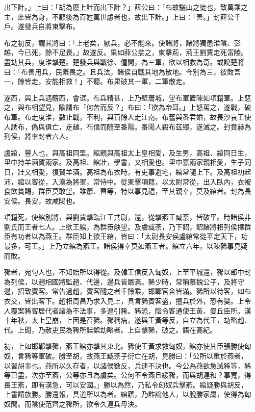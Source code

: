 \begin{pinyinscope}
出下計。」上曰：「胡為廢上計而出下計？」薛公曰：「布故驪山之徒也，致萬乘之主，此皆為身，不顧後為百姓萬世慮者也，故出下計。」上曰：「善。」封薛公千戶。遂發兵自將東擊布。

布之初反，謂其將曰：「上老矣，厭兵，必不能來。使諸將，諸將獨患淮陰、彭越，今已死，餘不足畏。」故遂反。果如薛公揣之，東擊荊，荊王劉賈走死富陵。盡劫其兵，度淮擊楚。楚發兵與戰徐、僮間，為三軍，欲以相救為奇。或說楚將曰：「布善用兵，民素畏之。且兵法，諸侯自戰其地為散地。今別為三，彼敗吾一，餘皆走，安能相救！」不聽。布果破其一軍，二軍散走。

遂西，與上兵遇蘄西，會诓。布兵精甚，上乃壁庸城，望布軍置陳如項籍軍。上惡之，與布相望見，隃謂布「何苦而反？」布曰：「欲為帝耳。」上怒罵之，遂戰，破布軍。布走度淮，數止戰，不利，與百餘人走江南。布舊與番君婚，故長沙哀王使人誘布，偽與俱亡，走越，布信而隨至番陽。番陽人殺布茲鄉，遂滅之。封賁赫為列侯，將率封者六人。

盧綰，豐人也，與高祖同里。綰親與高祖太上皇相愛，及生男，高祖、綰同日生，里中持羊酒賀兩家。及高祖、綰壯，學書，又相愛也。里中嘉兩家親相愛，生子同日，壯又相愛，復賀羊酒。高祖為布衣時，有吏事避宅，綰常隨上下。及高祖初起沛，綰以客從，入漢為將軍，常侍中。從東擊項籍，以太尉常從，出入臥內，衣被食飲賞賜，群臣莫敢望。雖蕭、曹等，特以事見禮，至其親幸，莫及綰者。封為長安侯。長安，故咸陽也。

項籍死，使綰別將，與劉賈擊臨江王共尉，還，從擊燕王臧荼，皆破平。時諸侯非劉氏而王者七人。上欲王綰，為群臣觖望。及虜臧荼，乃下詔，詔諸將相列侯擇群臣有功者以為燕王。群臣知上欲王綰，皆曰：「太尉長安侯盧綰常從平定天下，功最多，可王。」上乃立綰為燕王。諸侯得幸莫如燕王者。綰立六年，以陳豨事見疑而敗。

豨者，宛句人也，不知始所以得從。及韓王信反入匈奴，上至平城還，豨以郎中封為列侯，以趙相國將監趙、代邊，邊兵皆屬焉。豨少時，常稱慕魏公子，及將守邊，招致賓客。常告過趙，賓客隨之者千餘乘，邯鄲官舍皆滿。豨所以待客，如布衣交，皆出客下。趙相周昌乃求入見上，具言豨賓客盛，擅兵於外，恐有變。上令人覆案豨客居代者諸為不法事，多連引豨。豨恐，陰令客通使王黃、曼丘臣所。漢十年秋，太上皇崩，上因是召豨。豨稱病，遂與王黃等反，自立為代王，劫略趙、代。上聞，乃赦吏民為豨所詿誤劫略者。上自擊豨，破之。語在高紀。

初，上如邯鄲擊豨，燕王綰亦擊其東北。豨使王黃求救匈奴，綰亦使其臣張勝使匈奴，言豨等軍破。勝至胡，故燕王臧荼子衍亡在胡，見勝曰：「公所以重於燕者，以習胡事也。燕所以久存者，以諸侯數反，兵連不決也。今公為燕欲急滅豨等，豨等已盡，次亦至燕，公等亦且為虜矣。公何不令燕且緩豨，而與胡連和？事寬，得長王燕，即有漢急，可以安國。」勝以為然，乃私令匈奴兵擊燕。綰疑勝與胡反，上書請族勝。勝還報，具道所以為者。綰寤，乃詐論他人，以脫勝家屬，使得為匈奴間。而陰使范齊之豨所，欲令久連兵毋決。


\end{pinyinscope}
